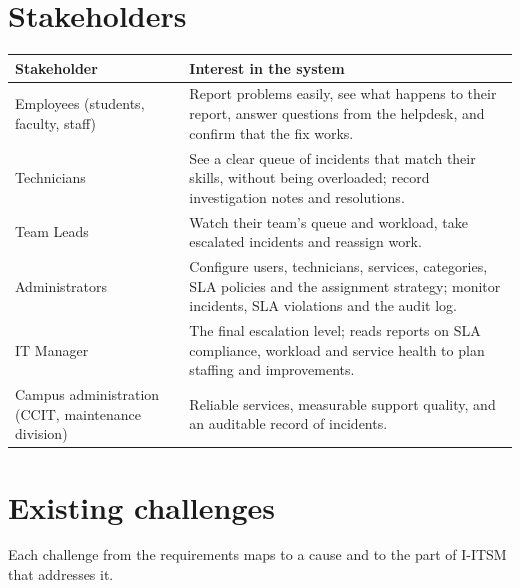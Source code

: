 \section{Stakeholders}

\noindent\begin{tabularx}{\textwidth}{@{}>{\raggedright\arraybackslash}p{4.2cm}>{\raggedright\arraybackslash}X@{}}
\toprule
\textbf{Stakeholder} & \textbf{Interest in the system} \\
\midrule
Employees (students, faculty, staff) & Report problems easily, see what happens to their report,
  answer questions from the helpdesk, and confirm that the fix works. \\
Technicians & See a clear queue of incidents that match their skills, without being overloaded;
  record investigation notes and resolutions. \\
Team Leads & Watch their team's queue and workload, take escalated incidents and reassign work. \\
Administrators & Configure users, technicians, services, categories, SLA policies and the
  assignment strategy; monitor incidents, SLA violations and the audit log. \\
IT Manager & The final escalation level; reads reports on SLA compliance, workload and service
  health to plan staffing and improvements. \\
Campus administration (CCIT, maintenance division) & Reliable services, measurable support
  quality, and an auditable record of incidents. \\
\bottomrule
\end{tabularx}

\section{Existing challenges}

Each challenge from the requirements maps to a cause and to the part of I-ITSM that addresses
it.

